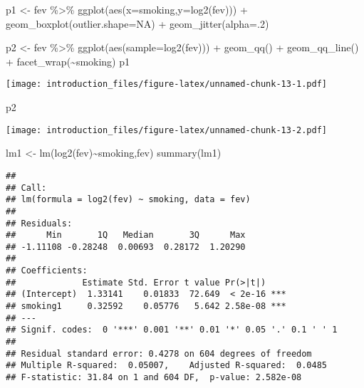 \documentclass[
]{article}
\newenvironment{Shaded}{\begin{snugshade}}{\end{snugshade}}
\newcommand{\AttributeTok}[1]{\textcolor[rgb]{0.77,0.63,0.00}{#1}}
\newcommand{\ConstantTok}[1]{\textcolor[rgb]{0.00,0.00,0.00}{#1}}
\newcommand{\DecValTok}[1]{\textcolor[rgb]{0.00,0.00,0.81}{#1}}
\newcommand{\FunctionTok}[1]{\textcolor[rgb]{0.00,0.00,0.00}{#1}}
\newcommand{\NormalTok}[1]{#1}
\newcommand{\OtherTok}[1]{\textcolor[rgb]{0.56,0.35,0.01}{#1}}
\newcommand{\SpecialCharTok}[1]{\textcolor[rgb]{0.00,0.00,0.00}{#1}}
\begin{document}
\begin{Shaded}
\begin{Highlighting}[]
\NormalTok{p1 }\OtherTok{\textless{}{-}}\NormalTok{ fev }\SpecialCharTok{\%\textgreater{}\%}
  \FunctionTok{ggplot}\NormalTok{(}\FunctionTok{aes}\NormalTok{(}\AttributeTok{x=}\NormalTok{smoking,}\AttributeTok{y=}\FunctionTok{log2}\NormalTok{(fev))) }\SpecialCharTok{+}
  \FunctionTok{geom\_boxplot}\NormalTok{(}\AttributeTok{outlier.shape=}\ConstantTok{NA}\NormalTok{) }\SpecialCharTok{+}
  \FunctionTok{geom\_jitter}\NormalTok{(}\AttributeTok{alpha=}\NormalTok{.}\DecValTok{2}\NormalTok{)}

\NormalTok{p2 }\OtherTok{\textless{}{-}}\NormalTok{ fev }\SpecialCharTok{\%\textgreater{}\%}
  \FunctionTok{ggplot}\NormalTok{(}\FunctionTok{aes}\NormalTok{(}\AttributeTok{sample=}\FunctionTok{log2}\NormalTok{(fev))) }\SpecialCharTok{+}
  \FunctionTok{geom\_qq}\NormalTok{() }\SpecialCharTok{+}
  \FunctionTok{geom\_qq\_line}\NormalTok{() }\SpecialCharTok{+}
  \FunctionTok{facet\_wrap}\NormalTok{(}\SpecialCharTok{\textasciitilde{}}\NormalTok{smoking)}
\NormalTok{p1}
\end{Highlighting}
\end{Shaded}

\texttt{[image: introduction\_files/figure-latex/unnamed-chunk-13-1.pdf]}

\begin{Shaded}
\begin{Highlighting}[]
\NormalTok{p2}
\end{Highlighting}
\end{Shaded}

\texttt{[image: introduction\_files/figure-latex/unnamed-chunk-13-2.pdf]}

\begin{Shaded}
\begin{Highlighting}[]
\NormalTok{lm1 }\OtherTok{\textless{}{-}} \FunctionTok{lm}\NormalTok{(}\FunctionTok{log2}\NormalTok{(fev)}\SpecialCharTok{\textasciitilde{}}\NormalTok{smoking,fev)}
\FunctionTok{summary}\NormalTok{(lm1)}
\end{Highlighting}
\end{Shaded}

\begin{verbatim}
## 
## Call:
## lm(formula = log2(fev) ~ smoking, data = fev)
## 
## Residuals:
##      Min       1Q   Median       3Q      Max 
## -1.11108 -0.28248  0.00693  0.28172  1.20290 
## 
## Coefficients:
##             Estimate Std. Error t value Pr(>|t|)    
## (Intercept)  1.33141    0.01833  72.649  < 2e-16 ***
## smoking1     0.32592    0.05776   5.642 2.58e-08 ***
## ---
## Signif. codes:  0 '***' 0.001 '**' 0.01 '*' 0.05 '.' 0.1 ' ' 1
## 
## Residual standard error: 0.4278 on 604 degrees of freedom
## Multiple R-squared:  0.05007,    Adjusted R-squared:  0.0485 
## F-statistic: 31.84 on 1 and 604 DF,  p-value: 2.582e-08
\end{verbatim}
\end{document}
